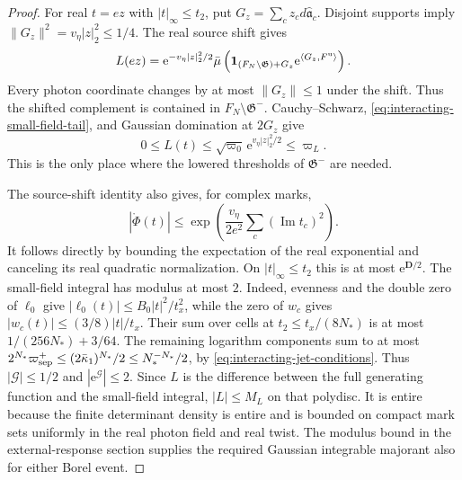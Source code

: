 \documentclass[11pt,letterpaper,reqno]{amsart}
\begin{document}
\begin{proof}
For real $t=ez$ with $|t|_\infty\le t_2$,
put $G_z=\sum_cz_cd\widehat{\mathfrak a}_c$.
Disjoint supports imply
$\|G_z\|^2=v_\eta|z|_2^2\le1/4$.
The real source shift gives
\[
 L(ez)=\mathrm e^{-v_\eta|z|_2^2/2}
 \bar\mu\left(\mathbf1_{(F_N\setminus\mathfrak G)+G_z}
                              \mathrm e^{\langle G_z,F^{\rm u}\rangle}\right).
\]
Every photon coordinate changes by at most
$\|G_z\|\le1$ under the shift. Thus the
shifted complement is contained in
$F_N\setminus\mathfrak G^-$.
Cauchy--Schwarz, \eqref{eq:interacting-small-field-tail},
and Gaussian domination at $2G_z$ give
\begin{equation}\label{eq:interacting-real-complement}
 0\le L(t)\le\sqrt{\varpi_0}\,
          \mathrm e^{v_\eta|z|_2^2/2}\le\varpi_L .
\end{equation}
This is the only place where the lowered
thresholds of $\mathfrak G^-$ are needed.

The source-shift identity also gives, for complex marks,
\[
 |\mathring\Phi(t)|\le
       \exp\left(\frac{v_\eta}{2e^2}
                                      \sum_c(\operatorname{Im}t_c)^2\right).
\]
It follows directly by bounding the expectation
of the real exponential and canceling its
real quadratic normalization.
On $|t|_\infty\le t_2$ this is at most
$\mathrm e^{\mathbf D/2}$.
The small-field integral has modulus at most
$2$. Indeed, evenness and the double zero of
$\ell_0$ give $|\ell_0(t)|\le B_0|t|^2/t_x^2$,
while the zero of $w_c$ gives
$|w_c(t)|\le(3/8)|t|/t_x$.
Their sum over cells at
$t_2\le t_x/(8N_*)$ is at most
$1/(256N_*)+3/64$. The remaining logarithm
components sum to at most
$2^{N_*}\varpi_{\rm sep}^+
\le(2\bar\kappa_1)^{N_*}/2\le N_*^{-N_*}/2$,
by \eqref{eq:interacting-jet-conditions}.
Thus $|\mathcal G|\le1/2$ and
$|\mathrm e^{\mathcal G}|\le2$.
Since $L$ is the difference between the
full generating function and the small-field
integral, $|L|\le M_L$ on that polydisc.
It is entire because the finite determinant
density is entire and is bounded on compact
mark sets uniformly in the real photon
field and real twist. The modulus bound
in the external-response section supplies
the required Gaussian integrable majorant
also for either Borel event.


\end{proof}
\end{document}
